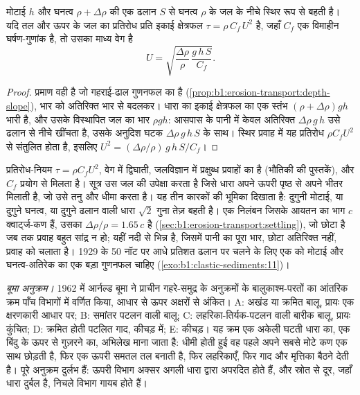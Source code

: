 \begin{proposition}[गंदलाव-धारा की गति]\label{prop:b1:clastic-sediments:turbidity}
मोटाई $h$ और घनत्व $\rho + \Delta\rho$ की एक  ढलान $S$ से घनत्व $\rho$ के जल के नीचे स्थिर रूप से बहती है। यदि तल और ऊपर के जल का प्रतिरोध प्रति इकाई क्षेत्रफल $\tau = \rho\,C_f\,U^2$ है, जहाँ $C_f$ एक विमाहीन घर्षण-गुणांक है, तो उसका माध्य वेग है
\[
  U = \sqrt{\frac{\Delta\rho}{\rho}\,\frac{g\,h\,S}{C_f}} .
\]
\end{proposition}

\begin{proof}
प्रमाण वही है जो गहराई-ढाल गुणनफल का है (\cref{prop:b1:erosion-transport:depth-slope}), भार को अतिरिक्त भार से बदलकर। धारा का इकाई क्षेत्रफल का एक स्तंभ $(\rho +
\Delta\rho) g h$ भारी है, और उसके विस्थापित जल का भार $\rho g h$: आसपास के पानी में केवल अतिरिक्त $\Delta\rho\,g\,h$ उसे ढलान से नीचे खींचता है, उसके अनुदिश घटक $\Delta\rho\,g\,h\,S$ के साथ। स्थिर प्रवाह में यह प्रतिरोध $\rho C_f U^2$ से संतुलित होता है, इसलिए $U^2 = (\Delta\rho/\rho)\,g\,h\,S/C_f$।
\end{proof}

प्रतिरोध-नियम $\tau = \rho C_f U^2$, वेग में द्विघाती, जलविज्ञान में प्रक्षुब्ध प्रवाहों का है (भौतिकी की पुस्तकें), और $C_f$ प्रयोग से मिलता है। सूत्र उस जल की उपेक्षा करता है जिसे धारा अपने ऊपरी पृष्ठ से अपने भीतर मिलाती है, जो उसे तनु और धीमा करता है। यह तीन कारकों की भूमिका दिखाता है: दुगुनी मोटाई, या दुगुने घनत्व, या दुगुने ढलान वाली धारा $\sqrt 2$ गुना तेज़ बहती है। एक निलंबन जिसके आयतन का भाग $c$ क्वार्ट्ज-कण हैं, उसका $\Delta\rho/\rho = 1.65\,c$ है (\cref{sec:b1:erosion-transport:settling}), जो छोटा है जब तक प्रवाह बहुत सांद्र न हो; यहीं  नदी से भिन्न है, जिसमें पानी का पूरा भार, छोटा अतिरिक्त नहीं, प्रवाह को चलाता है। 1929 के 50 नॉट पर आधे प्रतिशत ढलान पर चलने के लिए एक  को मोटाई और घनत्व-अतिरेक का एक बड़ा गुणनफल चाहिए (\cref{exo:b1:clastic-sediments:11})।

\emph{बूमा अनुक्रम।} 1962 में आर्नल्ड बूमा ने प्राचीन गहरे-समुद्र के अनुक्रमों के बालुकाश्म-परतों का आंतरिक क्रम पाँच विभागों में वर्णित किया, आधार से ऊपर अक्षरों से अंकित। A: अखंड या क्रमित बालू, प्रायः एक क्षरणकारी आधार पर; B: समांतर पटलन वाली बालू; C: लहरिका-तिर्यक-पटलन वाली बारीक बालू, प्रायः कुंचित; D: क्रमित होती पटलित गाद, कीचड़ में; E: कीचड़। यह क्रम एक अकेली घटती धारा का, एक बिंदु के ऊपर से गुज़रने का, अभिलेख माना जाता है: धीमी होती हुई वह पहले अपने सबसे मोटे कण एक साथ छोड़ती है, फिर एक ऊपरी समतल तल बनाती है, फिर लहरिकाएँ, फिर गाद और मृत्तिका बैठने देती है। पूरे अनुक्रम दुर्लभ हैं: ऊपरी विभाग अक्सर अगली धारा द्वारा अपरदित होते हैं, और स्रोत से दूर, जहाँ धारा दुर्बल है, निचले विभाग गायब होते हैं।

